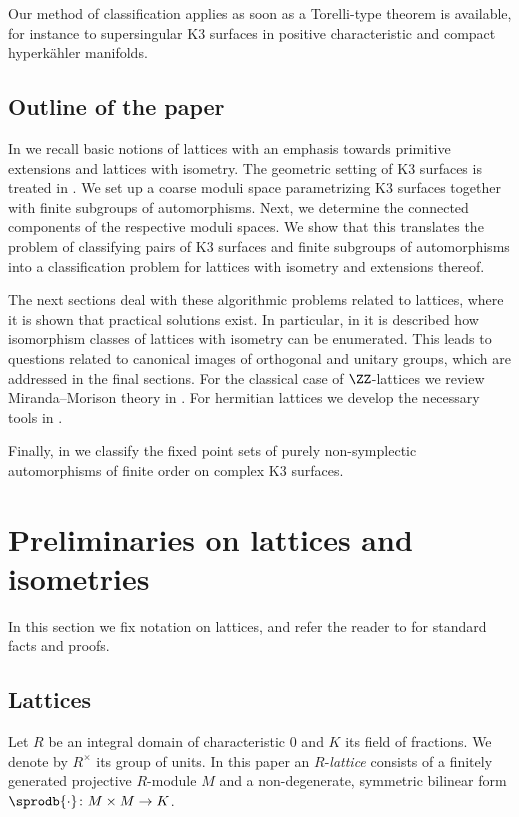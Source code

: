 Our method of classification applies as soon as a Torelli-type theorem is available, for instance
to supersingular K3 surfaces in positive characteristic and compact hyperk\"ahler manifolds.


\subsection*{Outline of the paper}

In  we recall basic notions of lattices with an emphasis towards primitive extensions and lattices with isometry.
The geometric setting of K3 surfaces is treated in . We set up a coarse moduli space
parametrizing K3 surfaces together with finite subgroups of automorphisms. Next, we determine the connected components of the respective moduli spaces.
We show that this translates the problem of classifying pairs of K3 surfaces and finite subgroups of automorphisms
into a classification problem for lattices with isometry and extensions thereof.

The next sections deal with these algorithmic problems related to lattices, where it is shown that practical solutions exist.
In particular, in  it is described how isomorphism classes of lattices with isometry can be enumerated.
This leads to questions related to canonical images of orthogonal and unitary groups, which are addressed in the final sections. For the classical case of $\ZZ$-lattices we review Miranda--Morison theory in . For hermitian lattices we develop the necessary tools in .

Finally, in  we classify the fixed point sets of purely non-symplectic automorphisms of finite order on complex K3 surfaces.

\ackintro

\section{Preliminaries on lattices and isometries}\label{sec:lat}
In this section we fix notation on lattices, and refer the reader to \cite{nikulin1980_forms,splag, kneser2002} for standard facts and proofs.

\subsection{Lattices}\label{sect:lattices}
Let $R$ be an integral domain of characteristic $0$ and $K$ its field of fractions.
We denote by $R^\times$ its group of units.
In this paper an $R$-\emph{lattice} consists of a finitely generated projective $R$-module $M$ and
a non-degenerate, symmetric bilinear form $\sprodb{\cdot} \colon M \times M \to K$.

